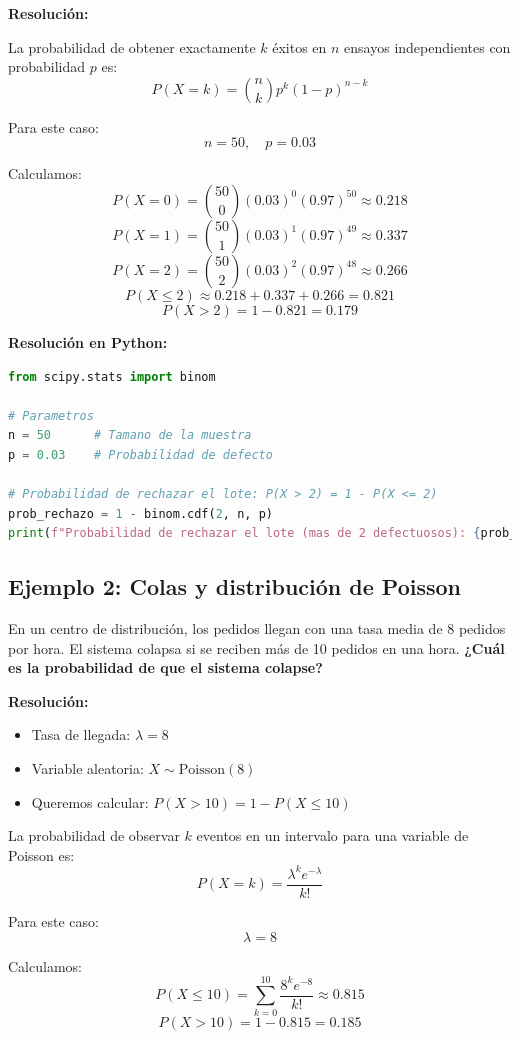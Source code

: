 \documentclass[12pt]{article}
\begin{document}
\textbf{Resolución:}

La probabilidad de obtener exactamente $k$ éxitos en $n$ ensayos independientes con probabilidad $p$ es:
\[
P(X = k) = \binom{n}{k} p^k (1-p)^{n-k}
\]

Para este caso:
\[
n = 50, \quad p = 0.03
\]

Calculamos:
\[
P(X=0) = \binom{50}{0} (0.03)^0 (0.97)^{50} \approx 0.218
\]
\[
P(X=1) = \binom{50}{1} (0.03)^1 (0.97)^{49} \approx 0.337
\]
\[
P(X=2) = \binom{50}{2} (0.03)^2 (0.97)^{48} \approx 0.266
\]
\[
P(X \leq 2) \approx 0.218 + 0.337 + 0.266 = 0.821
\]
\[
P(X > 2) = 1 - 0.821 = 0.179
\]

\textbf{Resolución en Python:}

\begin{lstlisting}[language=Python]
from scipy.stats import binom

# Parametros
n = 50      # Tamano de la muestra
p = 0.03    # Probabilidad de defecto

# Probabilidad de rechazar el lote: P(X > 2) = 1 - P(X <= 2)
prob_rechazo = 1 - binom.cdf(2, n, p)
print(f"Probabilidad de rechazar el lote (mas de 2 defectuosos): {prob_rechazo:.4f}")
\end{lstlisting}

\subsection{Ejemplo 2: Colas y distribución de Poisson}

En un centro de distribución, los pedidos llegan con una tasa media de 8 pedidos por hora. El sistema colapsa si se reciben más de 10 pedidos en una hora. \textbf{¿Cuál es la probabilidad de que el sistema colapse?}

\textbf{Resolución:}

\begin{itemize}
    \item Tasa de llegada: $\lambda = 8$
    \item Variable aleatoria: $X \sim \text{Poisson}(8)$
    \item Queremos calcular: $P(X > 10) = 1 - P(X \leq 10)$
\end{itemize}

La probabilidad de observar $k$ eventos en un intervalo para una variable de Poisson es:
\[
P(X = k) = \frac{\lambda^k e^{-\lambda}}{k!}
\]

Para este caso:
\[
\lambda = 8
\]

Calculamos:
\[
P(X \leq 10) = \sum_{k=0}^{10} \frac{8^k e^{-8}}{k!} \approx 0.815
\]
\[
P(X > 10) = 1 - 0.815 = 0.185
\]
\end{document}
